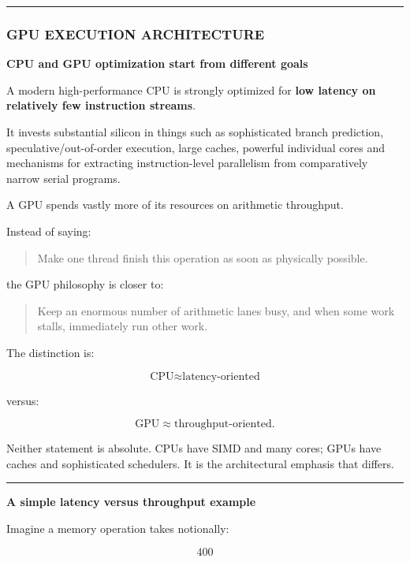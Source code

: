 \begin{center}\rule{0.5\linewidth}{0.5pt}\end{center}

\subsubsection{GPU EXECUTION ARCHITECTURE}\label{gpu-execution-architecture}

\textbf{CPU and GPU optimization start from different goals}

A modern high-performance CPU is strongly optimized for \textbf{low latency on relatively few instruction streams}.

It invests substantial silicon in things such as sophisticated branch prediction, speculative/out-of-order execution, large caches, powerful individual cores and mechanisms for extracting instruction-level parallelism from comparatively narrow serial programs.

A GPU spends vastly more of its resources on arithmetic throughput.

Instead of saying:

\begin{quote}
Make one thread finish this operation as soon as physically possible.
\end{quote}

the GPU philosophy is closer to:

\begin{quote}
Keep an enormous number of arithmetic lanes busy, and when some work stalls, immediately run other work.
\end{quote}

The distinction is:

\[
\boxed{
\text{CPU}\approx\text{latency-oriented}
}
\]

versus:

\[
\boxed{
\text{GPU}\approx\text{throughput-oriented}.
}
\]

Neither statement is absolute. CPUs have SIMD and many cores; GPUs have caches and sophisticated schedulers. It is the architectural emphasis that differs.

\begin{center}\rule{0.5\linewidth}{0.5pt}\end{center}

\textbf{A simple latency versus throughput example}

Imagine a memory operation takes notionally:

\[
400
\]

